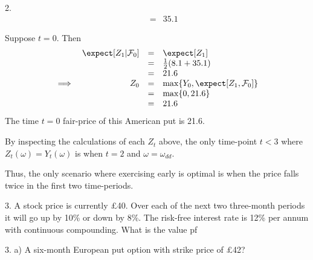 \documentclass[11pt,a4paper]{article}
\begin{document}
\begin{answer}{2.}
\[\begin{array}{rrcl}
    &&=&35.1
  \end{array}\]
  \par Suppose $t=0$. Then
  \[\begin{array}{rrcl}
    &\expect[Z_1|\mathcal{F}_0]&=&\expect[Z_1]\\
    &&=&\frac12(8.1+35.1)\\
    &&=&21.6\\
    \implies&Z_0&=&\max\{Y_0,\expect[Z_1,\mathcal{F}_0]\}\\
    &&=&\max\{0,21.6\}\\
    &&=&21.6
  \end{array}\]
  The time $t=0$ fair-price of this American put is 21.6.
  \par By inspecting the calculations of each $Z_t$ above, the only time-point $t<3$ where $Z_t(\omega)=Y_t(\omega)$ is when $t=2$ and $\omega=\omega_{dd}$.
  \par Thus, the only scenario where exercising early is optimal is when the price falls twice in the first two time-periods.
\end{answer}

\begin{question}{3.}
  A stock price is currently £40. Over each of the next two three-month periods it will go up by 10\% or down by 8\%. The risk-free interest rate is 12\% per annum with continuous compounding. What is the value pf
\end{question}

\begin{question}{3. a)}
  A six-month European put option with strike price of £42?
\end{question}
\end{document}
